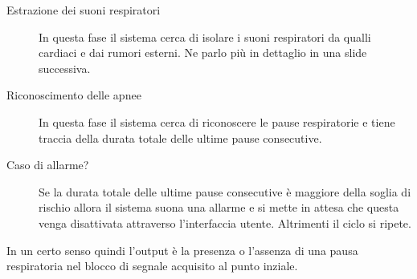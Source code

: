 \begin{description}
  \item[Estrazione dei suoni respiratori]
    In questa fase il sistema cerca di isolare i suoni respiratori da qualli cardiaci e dai rumori esterni. 
    Ne parlo pi\`u in dettaglio in una slide successiva.
  \item[Riconoscimento delle apnee]
    In questa fase il sistema cerca di riconoscere le pause respiratorie e tiene traccia della durata totale delle ultime pause consecutive.
  \item[Caso di allarme?]
    Se la durata totale delle ultime pause consecutive \`e maggiore della soglia di rischio allora il sistema suona una allarme e si mette in attesa che questa venga disattivata attraverso l'interfaccia utente.
    Altrimenti il ciclo si ripete.
\end{description}

In un certo senso quindi l'output \`e la presenza o l'assenza di una pausa respiratoria nel blocco di segnale acquisito al punto inziale.
% 
% 
% 
% 
% 
% 



